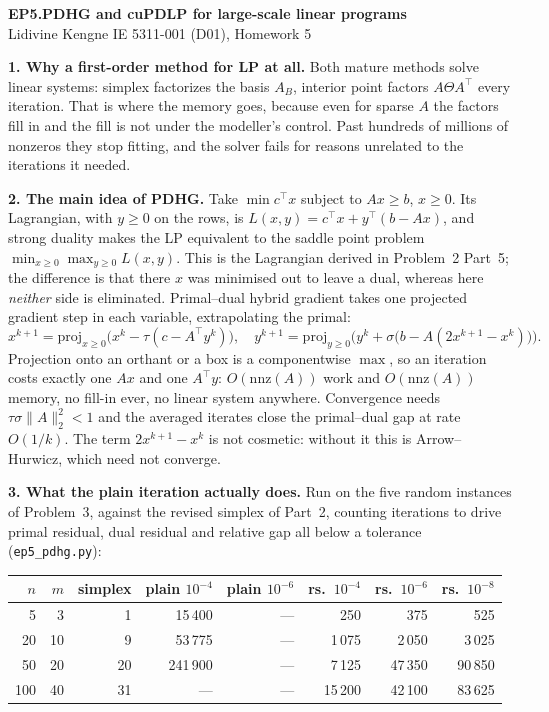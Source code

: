 \documentclass[10pt]{article}
\newcommand{\proj}{\mathrm{proj}}
\begin{document}
{\large\bfseries EP5.\quad PDHG and cuPDLP for large-scale linear programs}\\[1pt]
{\small Lidivine Kengne \quad\textbar\quad IE 5311-001 (D01), Homework 5}
\vspace{0.3em}

\textbf{1. Why a first-order method for LP at all.}
Both mature methods solve linear systems: simplex factorizes the basis
$A_B$, interior point factors $A \Theta A^{\!\top}$ every iteration.
That is where the memory goes, because even for sparse $A$ the factors
fill in and the fill is not under the modeller's control. Past
hundreds of millions of nonzeros they stop fitting, and the solver
fails for reasons unrelated to the iterations it needed.

\textbf{2. The main idea of PDHG.}
Take $\min c^{\!\top}x$ subject to $Ax \ge b$, $x \ge 0$. Its
Lagrangian, with $y \ge 0$ on the rows, is
$L(x,y) = c^{\!\top}x + y^{\!\top}(b - Ax)$, and strong duality makes
the LP equivalent to the saddle point problem
$\min_{x \ge 0} \max_{y \ge 0} L(x,y)$. This is the Lagrangian derived
in Problem~2 Part~5; the difference is that there $x$ was minimised out
to leave a dual, whereas here \emph{neither} side is eliminated.
Primal--dual hybrid gradient takes one projected gradient step in each
variable, extrapolating the primal:
\[
  x^{k+1} = \proj_{x \ge 0}\!\bigl(x^{k} - \tau (c - A^{\!\top} y^{k})\bigr),
  \quad
  y^{k+1} = \proj_{y \ge 0}\!\bigl(y^{k} + \sigma \bigl(b - A(2x^{k+1} - x^{k})\bigr)\bigr).
\]
Projection onto an orthant or a box is a componentwise $\max$, so an
iteration costs exactly one $Ax$ and one $A^{\!\top}y$:
$O(\mathrm{nnz}(A))$ work and $O(\mathrm{nnz}(A))$ memory, no fill-in
ever, no linear system anywhere. Convergence needs
$\tau\sigma\|A\|_2^2 < 1$ and the averaged iterates close the
primal--dual gap at rate $O(1/k)$. The term $2x^{k+1}-x^{k}$ is not
cosmetic: without it this is Arrow--Hurwicz, which need not converge.

\textbf{3. What the plain iteration actually does.}
Run on the five random instances of Problem~3, against the revised
simplex of Part~2, counting iterations to drive primal residual, dual
residual and relative gap all below a tolerance
(\texttt{ep5\_pdhg.py}):

\begin{center}\footnotesize
\setlength{\tabcolsep}{4pt}
\begin{tabular}{@{}rr r rr rrr@{}}
\toprule
$n$ & $m$ & simplex & plain $10^{-4}$ & plain $10^{-6}$
  & rs.\ $10^{-4}$ & rs.\ $10^{-6}$ & rs.\ $10^{-8}$\\
\midrule
  5 &  3 &  1 &  15\,400 & --- &    250 &    375 &    525\\
 20 & 10 &  9 &  53\,775 & --- & 1\,075 & 2\,050 & 3\,025\\
 50 & 20 & 20 & 241\,900 & --- & 7\,125 & 47\,350 & 90\,850\\
100 & 40 & 31 & ---       & --- & 15\,200 & 42\,100 & 83\,625\\
\bottomrule
\end{tabular}
\end{center}
\end{document}
